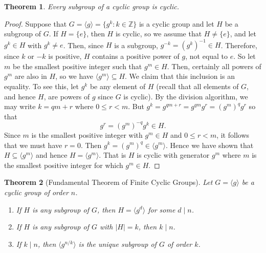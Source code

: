 \documentclass[12pt]{article}
\newcommand{\Z} {{\mathbb Z}}
\newcommand{\divides}{\ensuremath{\mid}}
\newcommand{\<}{\ensuremath{\langle}}
\renewcommand{\>}{\ensuremath{\rangle}}
\newcommand{\eye}{\ensuremath{e}}
\theoremstyle{plain}
\newtheorem{thm}{Theorem}%
\theoremstyle{definition}
\begin{document}
\begin{thm}
\label{thm:9}   Every subgroup of a cyclic group is cyclic.
\end{thm}

\begin{proof}
Suppose that $G=\langle g\rangle =\{g^k: k\in \Z\}$ is a cyclic
group and let $H$ be a subgroup of $G$.  If $H=\{\eye\}$, then $H$ is
cyclic, so we assume that $H\ne \{\eye\}$, and let $g^k\in H$ with
$g^k\ne \eye$.  Then, since $H$ is a subgroup, $g^{-k} =
(g^k)^{-1}\in H$.  Therefore, since $k$ or $-k$ is positive,  $H$
contains a positive power of $g$, not equal to \eye.  So let $m$ be
the smallest positive integer such that $g^m\in H$.  Then,
certainly all powers of $g^m$ are also in $H$, so we have $\langle
g^m\rangle \subseteq H$.  We claim that this inclusion is an
equality.  To see this, let $g^k$ be any element of $H$ (recall
that all elements of $G$, and hence $H$, are powers of $g$ since
$G$ is cyclic).  By the division algorithm, we may write $k=qm+r$
where $0\le r<m$.  But $g^k=g^{qm+r}=g^{qm}g^r=(g^m)^qg^r$ so that
$$g^r=(g^m)^{-q}g^k\in H.$$ Since $m$ is the smallest positive
integer with $g^m\in H$ and $0\le r<m$, it follows that we must
have $r=0$.  Then $g^k=(g^m)^q\in \langle g^m\rangle$. Hence we
have shown that $H\subseteq \langle g^m\rangle$ and hence
$H=\langle g^m\rangle$.  That is $H$ is cyclic with generator
$g^m$ where $m$ is the smallest positive integer for which $g^m
\in H$.
\end{proof}

\begin{thm}[Fundamental Theorem of Finite Cyclic Groups]
\label{thm:10}
Let $G=\langle g\rangle$ be a cyclic group of order $n$.
\begin{enumerate}
\item  If $H$ is any subgroup of $G$, then $H=\langle g^d\rangle$ for some $d\divides n$.
\item  If $H$ is any subgroup of $G$ with $|H|=k$, then $k\divides n$.
\item  If $k\divides n$, then $\langle g^{n/k}\rangle$ is the unique subgroup
of $G$ of order $k$.
\end{enumerate}
\end{thm}
\end{document}
